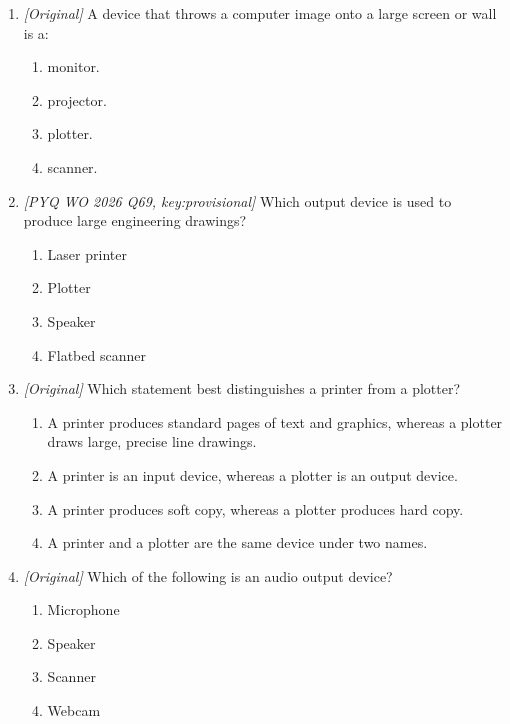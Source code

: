 \begin{enumerate}[label=\textbf{Q\arabic*.}, leftmargin=*]
\begin{enumerate}[label=\Alph*.]
    \item I and II only
    \item II and III only
    \item I and III only
    \item I, II and III
  \end{enumerate}
\item \textit{[Original]} A device that throws a computer image onto a large
  screen or wall is a:
  \begin{enumerate}[label=\Alph*.]
    \item monitor.
    \item projector.
    \item plotter.
    \item scanner.
  \end{enumerate}
\item \textit{[PYQ WO 2026 Q69, key:provisional]} Which output device is used
  to produce large engineering drawings?
  \begin{enumerate}[label=\Alph*.]
    \item Laser printer
    \item Plotter
    \item Speaker
    \item Flatbed scanner
  \end{enumerate}
\item \textit{[Original]} Which statement best distinguishes a printer from a
  plotter?
  \begin{enumerate}[label=\Alph*.]
    \item A printer produces standard pages of text and graphics, whereas a
      plotter draws large, precise line drawings.
    \item A printer is an input device, whereas a plotter is an output device.
    \item A printer produces soft copy, whereas a plotter produces hard copy.
    \item A printer and a plotter are the same device under two names.
  \end{enumerate}
\item \textit{[Original]} Which of the following is an audio output device?
  \begin{enumerate}[label=\Alph*.]
    \item Microphone
    \item Speaker
    \item Scanner
    \item Webcam
  \end{enumerate}

\end{enumerate}
